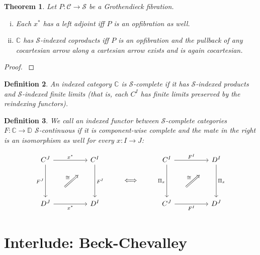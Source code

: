\documentclass[10pt, oneside]{article}
\newtheorem{theorem}{Theorem}[section]
\newtheorem{definition}[theorem]{Definition}
\begin{document}
\begin{theorem}
    Let $P: \mathcal{C} \to \mathcal{S}$ be a Grothendieck fibration.

    \begin{enumerate}[i)]
	\item Each $x^\ast$ has a left adjoint iff $P$ is an opfibration as well.

        \item $\mathbb{C}$ has $\mathcal{S}$-indexed coproducts iff $P$ is an opfibration and the pullback of any cocartesian arrow along a cartesian arrow exists and is again cocartesian.
    \end{enumerate}
\end{theorem}
\begin{proof}
    \cite[Lemma B.1.4.5]{Johnstone2002}
\end{proof}

\begin{definition}
    An indexed category $\mathbb{C}$ is $\mathcal{S}$-complete if it has $\mathcal{S}$-indexed products and $\mathcal{S}$-indexed finite limits (that is, each $C^I$ has finite limits preserved by the reindexing functors).
\end{definition}

\begin{definition}\label{def:indexed-continuous-functor}
    We call an indexed functor between $\mathcal{S}$-complete categories $F: \mathbb{C} \to \mathbb{D}$ $\mathcal{S}$-continuous if it is component-wise complete and the mate in the right is an isomorphism as well for every $x: I \to J$:

    \[\begin{tikzcd}[ampersand replacement=\&]
	{C^J} \&\& {C^I} \&\& {C^I} \&\& {D^I} \\
	\&\&\& \iff \\
	{D^J} \&\& {D^I} \&\& {C^J} \&\& {D^J}
	\arrow["{F^J}"', from=1-1, to=3-1]
	\arrow["{x^\ast}", from=1-1, to=1-3]
	\arrow["{x^\ast}"', from=3-1, to=3-3]
	\arrow["{F^I}", from=1-3, to=3-3]
	\arrow["\cong", shorten <=22pt, shorten >=22pt, Rightarrow, from=3-1, to=1-3]
	\arrow["{\Pi_x}"', from=1-5, to=3-5]
	\arrow["{F^I}"', from=3-5, to=3-7]
	\arrow["{F^I}", from=1-5, to=1-7]
	\arrow["{\Pi_x}", from=1-7, to=3-7]
	\arrow["\cong", shorten <=22pt, shorten >=22pt, Rightarrow, from=3-5, to=1-7]
\end{tikzcd}\]
\end{definition}

\section{Interlude: Beck-Chevalley}
\end{document}
